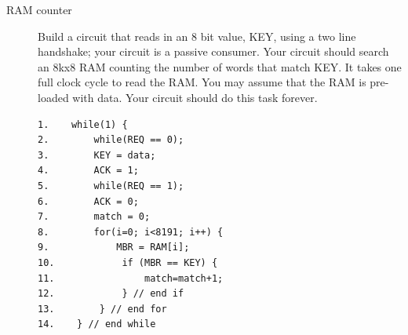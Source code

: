 \begin{description}
\pagebreak

\item[RAM counter]
Build a circuit that reads in an 8 bit value, KEY, using a two
line handshake; your circuit is a passive consumer.
Your circuit should search an 8kx8 RAM counting the number
of words that match KEY.  It takes one full clock cycle
to read the RAM.  You may assume that the RAM is pre-loaded
with data.  Your circuit should do this task forever.


\begin{verbatim}
1.    while(1) {
2.        while(REQ == 0);
3.        KEY = data;
4.        ACK = 1;
5.        while(REQ == 1);
6.        ACK = 0;
7.        match = 0;
8.        for(i=0; i<8191; i++) {
9.            MBR = RAM[i]; 
10.            if (MBR == KEY) {
11.                match=match+1;
12.            } // end if
13.        } // end for 
14.    } // end while
\end{verbatim}



\end{description}
